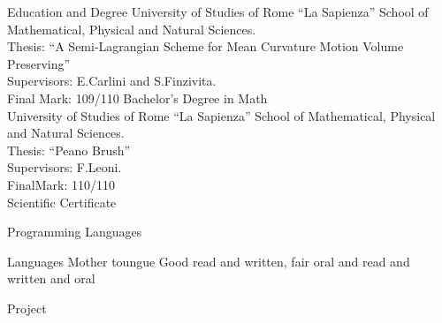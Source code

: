 \documentclass[a4paper,11pt,noweblinkbox=true]{dmCV}
\begin{document}
\address{Via Prenestina 226}
\personaldata
\begin{eventlist}{Education and Degree}
 University of Studies of Rome ``La Sapienza'' School of 
 Mathematical, Physical and Natural Sciences.\\
 Thesis: ``A Semi-Lagrangian Scheme for Mean Curvature Motion Volume
 Preserving''\\  
 Supervisors: E.Carlini and  S.Finzivita.\\
 Final Mark: 109/110
  {Bachelor's Degree in Math}\\ 
 University of Studies of Rome ``La Sapienza'' School of 
 Mathematical, Physical and Natural Sciences.\\
 Thesis: ``Peano Brush''\\
 Supervisors: F.Leoni.\\ 
 FinalMark: 110/110
 \\
       {\scriptsize Scientific Certificate}
\end{eventlist}

\begin{eventlist}{Programming Languages}
\end{eventlist}

\begin{eventlist}{Languages}
   Mother toungue
   Good read and written, fair oral and read and
  written and oral
\end{eventlist}

\begin{eventlist}{Project}
  \item 
  \item
  \item
\end{eventlist}
 
\end{document}
